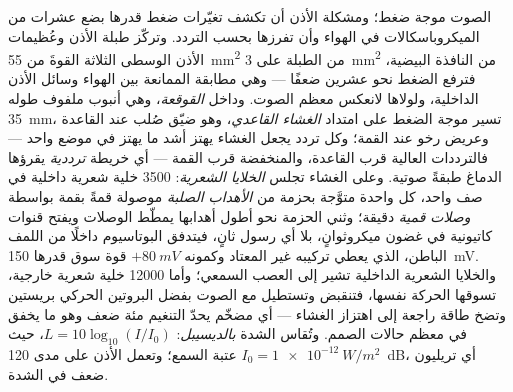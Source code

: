 \begin{definition}[القوقعة]\label{def:b3:sensory-systems:cochlea}
الصوت موجة ضغط؛ ومشكلة الأذن أن تكشف تغيّرات ضغط قدرها بضع
عشرات من الميكروباسكالات في الهواء وأن تفرزها بحسب التردد.
وتركّز طبلة الأذن وعُظيمات الأذن الوسطى الثلاثة القوةَ من
\qty{55}{mm^2} من الطبلة على \qty{3}{mm^2} من النافذة
البيضية، فترفع الضغط نحو عشرين ضعفًا --- وهي مطابقة الممانعة
بين الهواء وسائل الأذن الداخلية، ولولاها لانعكس معظم الصوت.
وداخل \emph{القوقعة}، وهي أنبوب ملفوف طوله \qty{35}{mm}،
تسير موجة الضغط على امتداد \emph{الغشاء القاعدي}، وهو ضيّق
صُلب عند القاعدة وعريض رخو عند القمة؛ وكل تردد يجعل الغشاء
يهتز أشد ما يهتز في موضع واحد --- فالترددات العالية قرب
القاعدة، والمنخفضة قرب القمة --- أي خريطة \emph{ترددية}
يقرؤها الدماغ طبقةً صوتية. وعلى الغشاء تجلس \emph{الخلايا
الشعرية}: \num{3500} خلية شعرية داخلية في صف واحد، كل واحدة
متوَّجة بحزمة من \emph{الأهداب الصلبة} موصولة قمةً بقمة
بواسطة \emph{وصلات قمية} دقيقة؛ وثني الحزمة نحو أطول أهدابها
يمطّط الوصلات ويفتح قنوات كاتيونية في غضون ميكروثوانٍ، بلا
أي رسول ثانٍ، فيتدفق البوتاسيوم داخلًا من اللمف الباطن،
الذي يعطي تركيبه غير المعتاد وكمونه $+\qty{80}{mV}$ قوة سوق
قدرها \qty{150}{mV}. والخلايا الشعرية الداخلية تشير إلى
العصب السمعي؛ وأما \num{12000} خلية شعرية خارجية، تسوقها
الحركة نفسها، فتنقبض وتستطيل مع الصوت بفضل البروتين الحركي
بريستين وتضخ طاقة راجعة إلى اهتزاز الغشاء --- أي مضخّم يحدّ
التنغيم مئة ضعف وهو ما يخفق في معظم حالات الصمم. وتُقاس
الشدة \emph{بالديسيبل}: $L = 10\log_{10}
(I/I_{0})$، حيث $I_{0} = \qty{1e-12}{W/m^2}$ عتبة السمع؛
وتعمل الأذن على مدى \qty{120}{dB}، أي تريليون ضعف في الشدة.
\end{definition}

